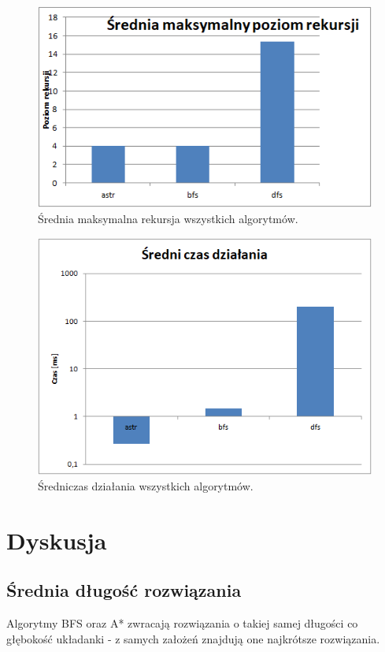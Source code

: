 \documentclass{classrep}
\begin{document}
\begin{figure}[H]
	\centering
		\includegraphics[width=1\textwidth]{Wykresy/19.png}
	\caption{Średnia maksymalna rekursja wszystkich algorytmów.}
\end{figure}
\begin{figure}[H]
	\centering
		\includegraphics[width=1\textwidth]{Wykresy/20.png}
	\caption{Średniczas działania wszystkich algorytmów.}
\end{figure}

\section{Dyskusja}
\subsection{Średnia długość rozwiązania}
Algorytmy BFS oraz A*  zwracają rozwiązania o takiej samej długości co głębokość układanki - z samych założeń znajdują one najkrótsze rozwiązania.
\end{document}
